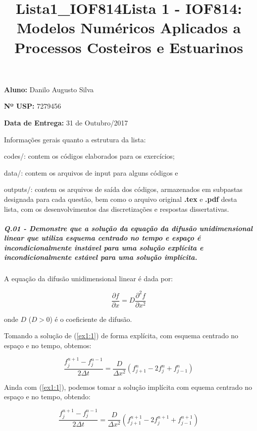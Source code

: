\documentclass[11pt]{article}
\title{Lista1\_IOF814}
\begin{document}
\title{Lista 1 - IOF814: Modelos Numéricos Aplicados a Processos Costeiros e Estuarinos}
\maketitle

\begin{center}
\textbf{Aluno:} Danilo Augusto Silva

\textbf{Nº USP:} 7279456

\textbf{Data de Entrega:} 31 de Outubro/2017
\end{center}
\vspace{0.5in}
Informações gerais quanto a estrutura da lista:

codes/: contem os códigos elaborados para os exercícios;

data/: contem os arquivos de input para alguns códigos e

outputs/: contem os arquivos de saída dos códigos, armazenados em
subpastas designada para cada questão, bem como o arquivo original \textbf{.tex}
e \textbf{.pdf} desta lista, com os desenvolvimentos das discretizações e
respostas dissertativas.

    \subparagraph{Q.01 - Demonstre que a solução da equação da difusão
unidimensional linear que utiliza esquema centrado no tempo e espaço é
incondicionalmente instável para uma solução explícita e
incondicionalmente estável para uma solução
implícita.}
A equação da difusão unidimensional linear é dada por:

\begin{equation}
\frac{\partial{f}}{\partial{x}} = D\frac{\partial^2{f}}{\partial{x^2}}
\label{ex1:1}
\end{equation}

onde \(D\) (\(D > 0\)) é o coeficiente de difusão.

Tomando a solução de (\ref{ex1:1}) de forma explícita, com esquema
centrado no espaço e no tempo, obtemos:

\begin{equation}
\frac{f^{n+1}_{j} - f^{n-1}_{j}}{2\Delta{t}} = \frac{D}{\Delta{x^2}}(f^{n}_{j+1} - 2f^{n}_{j} + f^{n}_{j-1})
\label{ex1:2}
\end{equation}

Ainda com (\ref{ex1:1}), podemos tomar a solução implícita com equema
centrado no espaço e no tempo, obtendo:

\begin{equation}
\frac{f^{n+1}_{j} - f^{n-1}_{j}}{2\Delta{t}} = \frac{D}{\Delta{x^2}}(f^{n+1}_{j+1} - 2f^{n+1}_{j} + f^{n+1}_{j-1})
\label{ex1:3}
\end{equation}
\end{document}

